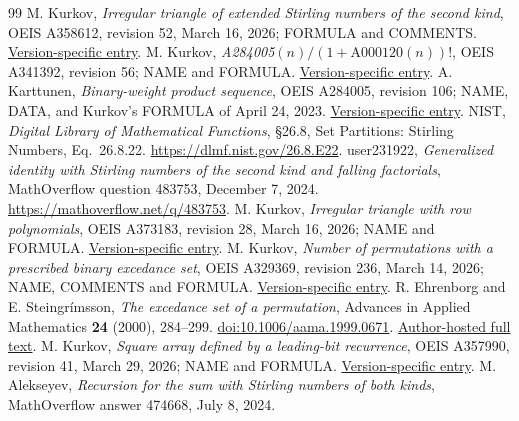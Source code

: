 \documentclass[11pt]{article}
\begin{document}
\begin{thebibliography}{99}
 M. Kurkov, \emph{Irregular triangle of extended Stirling
numbers of the second kind}, OEIS A358612, revision 52, March 16, 2026;
FORMULA and COMMENTS.
\href{https://raw.githubusercontent.com/oeis/oeisdata/d8ad22d9b98d2c427be8c6cd9f2672c600b8e3ae/seq/A358/A358612.seq}{Version-specific entry}.
 M. Kurkov, \emph{A284005$(n)/(1+\mathrm{A000120}(n))!$},
OEIS A341392, revision 56; NAME and FORMULA.
\href{https://raw.githubusercontent.com/oeis/oeisdata/d8ad22d9b98d2c427be8c6cd9f2672c600b8e3ae/seq/A341/A341392.seq}{Version-specific entry}.
 A. Karttunen, \emph{Binary-weight product sequence},
OEIS A284005, revision 106; NAME, DATA, and Kurkov's FORMULA of
April 24, 2023.
\href{https://raw.githubusercontent.com/oeis/oeisdata/d8ad22d9b98d2c427be8c6cd9f2672c600b8e3ae/seq/A284/A284005.seq}{Version-specific entry}.
 NIST, \emph{Digital Library of Mathematical Functions},
\S26.8, Set Partitions: Stirling Numbers, Eq.~26.8.22.
\url{https://dlmf.nist.gov/26.8.E22}.
 user231922, \emph{Generalized identity with Stirling numbers
of the second kind and falling factorials}, MathOverflow question 483753,
December 7, 2024. \url{https://mathoverflow.net/q/483753}.
 M. Kurkov, \emph{Irregular triangle with row polynomials},
OEIS A373183, revision 28, March 16, 2026; NAME and FORMULA.
\href{https://raw.githubusercontent.com/oeis/oeisdata/d8ad22d9b98d2c427be8c6cd9f2672c600b8e3ae/seq/A373/A373183.seq}{Version-specific entry}.
 M. Kurkov, \emph{Number of permutations with a prescribed
binary excedance set}, OEIS A329369, revision 236, March 14, 2026;
NAME, COMMENTS and FORMULA.
\href{https://raw.githubusercontent.com/oeis/oeisdata/d8ad22d9b98d2c427be8c6cd9f2672c600b8e3ae/seq/A329/A329369.seq}{Version-specific entry}.
 R. Ehrenborg and E. Steingr\'imsson,
\emph{The excedance set of a permutation}, Advances in Applied Mathematics
\textbf{24} (2000), 284--299. \href{https://doi.org/10.1006/aama.1999.0671}{doi:10.1006/aama.1999.0671}.
\href{https://www.ms.uky.edu/~jrge/papers/Excedance.pdf}{Author-hosted full text}.
 M. Kurkov, \emph{Square array defined by a leading-bit
recurrence}, OEIS A357990, revision 41, March 29, 2026; NAME and FORMULA.
\href{https://raw.githubusercontent.com/oeis/oeisdata/d8ad22d9b98d2c427be8c6cd9f2672c600b8e3ae/seq/A357/A357990.seq}{Version-specific entry}.
 M. Alekseyev, \emph{Recursion for the sum with Stirling
numbers of both kinds}, MathOverflow answer 474668, July 8, 2024.

\end{thebibliography}
\end{document}
